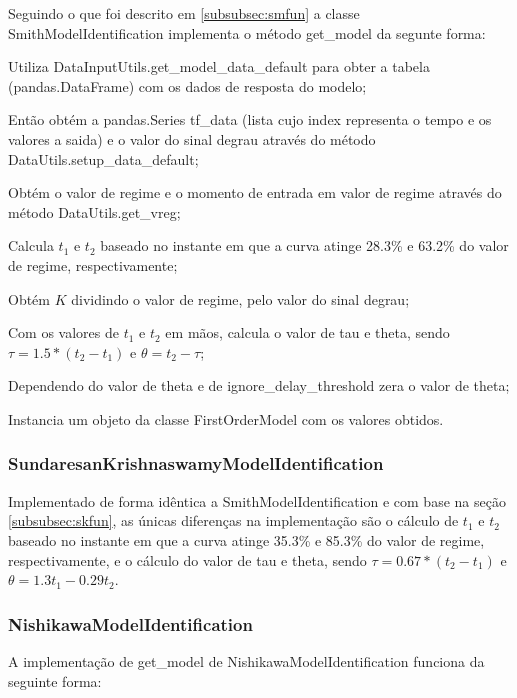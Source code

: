 Seguindo o que foi descrito em \ref{subsubsec:smfun} a classe SmithModelIdentification implementa o método get\_model da
segunte forma:

\begin{alineas}
    \item Utiliza DataInputUtils.get\_model\_data\_default para obter a tabela (pandas.DataFrame) com os dados de resposta do modelo;
    \item Então obtém a pandas.Series tf\_data (lista cujo index representa o tempo e os valores a saida) e o valor do sinal degrau através do método DataUtils.setup\_data\_default;
    \item Obtém o valor de regime e o momento de entrada em valor de regime através do método DataUtils.get\_vreg;
    \item Calcula $t_1$ e $t_2$ baseado no instante em que a curva atinge 28.3\% e 63.2\% do valor de regime, respectivamente;
    \item Obtém $K$ dividindo o valor de regime, pelo valor do sinal degrau;
    \item Com os valores de $t_1$ e $t_2$ em mãos, calcula o valor de tau e theta, sendo $\tau = 1.5*(t_2 - t_1)$ e $\theta = t_2 - \tau$;
    \item Dependendo do valor de theta e de ignore\_delay\_threshold zera o valor de theta;
    \item Instancia um objeto da classe FirstOrderModel com os valores obtidos.
\end{alineas}

\subsubsection{SundaresanKrishnaswamyModelIdentification}

Implementado de forma idêntica a SmithModelIdentification e com base na seção \ref{subsubsec:skfun}, as únicas
diferenças na implementação são o cálculo de $t_1$ e $t_2$ baseado no instante em que a curva atinge 35.3\% e 85.3\% do
valor de regime, respectivamente, e o cálculo do valor de tau e theta, sendo $\tau = 0.67*(t_2 - t_1)$ e
$\theta = 1.3t_1 - 0.29t_2$.

\subsubsection{NishikawaModelIdentification}
A implementação de get\_model de NishikawaModelIdentification funciona da seguinte forma:

